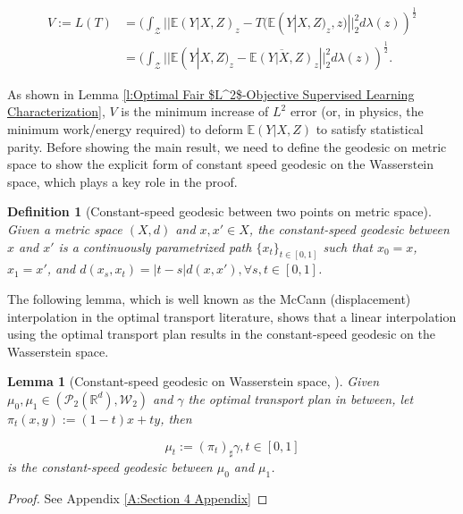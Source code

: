 \documentclass[twoside,11pt]{article}
\newtheorem{lem}{Lemma}[section]{\bfseries}{\itshape}
\newtheorem{defi}{Definition}[section]{\bfseries}{\itshape}
\begin{document}
\begin{align} \label{d:the optimal prediction error (V)}
V := L(T) & =( \int_{\mathcal{Z}} ||\mathbb{E}(Y|X,Z)_z - T(\mathbb{E}(Y|X,Z)_z,z)||_2^2 d\lambda(z))^{\frac{1}{2}}\\
& = ( \int_{\mathcal{Z}} ||\mathbb{E}(Y|X,Z)_z - \overline{\mathbb{E}(Y|X,Z)}_z||_2^2 d\lambda(z) )^{\frac{1}{2}}.
\end{align} 

As shown in Lemma \ref{l:Optimal Fair $L^2$-Objective Supervised Learning Characterization}, $V$ is the minimum increase of $L^2$ error (or, in physics, the minimum work/energy required) to deform $\mathbb{E}(Y|X,Z)$ to satisfy statistical parity. Before showing the main result, we need to define the geodesic on metric space to show the explicit form of constant speed geodesic on the Wasserstein space, which plays a key role in the proof.

\begin{defi} [Constant-speed geodesic between two points on metric space]
Given a metric space $(X,d)$ and $x,x' \in X$, the constant-speed geodesic between $x$ and $x'$ is a continuously parametrized path $\{x_t\}_{t \in [0,1]}$ such that $x_0 = x$, $x_1 = x'$, and $d(x_s,x_t) = |t-s|d(x,x'), \forall s,t \in [0,1]$.
\end{defi}

The following lemma, which is well known as the McCann (displacement) interpolation \cite[Chapter 7]{villani2009optimal} in the optimal transport literature, shows that a linear interpolation using the optimal transport plan results in the constant-speed geodesic on the Wasserstein space.

\begin{lem}[Constant-speed geodesic on Wasserstein space, \cite{mccann1997convexity, villani2009optimal}] \label{l:Mccann Interpolation}
Given $\mu_0,\mu_1 \in (\mathcal{P}_2(\mathbb{R}^d), \mathcal{W}_2)$ and $\gamma$ the optimal transport plan in between, let $\pi_t(x,y):= (1-t)x + ty$, then

\begin{equation}
\mu_t:= (\pi_t)_{\sharp} \gamma, t \in [0,1]
\end{equation}
is the constant-speed geodesic between $\mu_0$ and $\mu_1$.
\end{lem}

\begin{proof}
See Appendix \ref{A:Section 4 Appendix}
\end{proof}
\end{document}
